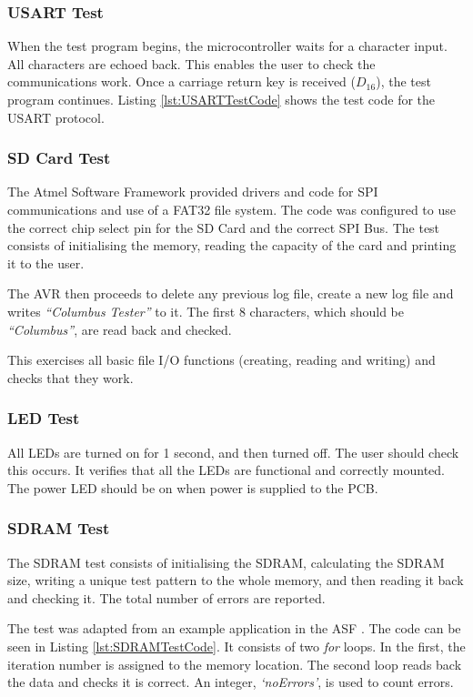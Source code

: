 \subsubsection{USART Test}\label{USART:Test}
When the test program begins, the microcontroller waits for a character input. All characters are echoed back. This enables the user to check the communications work. Once a carriage return key is received ($D_{16}$), the test program continues. Listing \ref{lst:USARTTestCode} shows the test code for the USART protocol.


\subsubsection{SD Card Test}\label{SD:Test}
The Atmel Software Framework \citep{Atmel:ASF} provided drivers and code for SPI communications and use of a FAT32 file system. The code was configured to use the correct chip select pin for the SD Card and the correct SPI Bus. The test consists of initialising the memory, reading the capacity of the card and printing it to the user. 

The AVR then proceeds to delete any previous log file, create a new log file and writes \textit{``Columbus Tester''} to it. The first 8 characters, which should be \textit{``Columbus''}, are read back and checked.

This exercises all basic file I/O functions (creating, reading and writing) and checks that they work.

\subsubsection{LED Test}\label{LED:Test}
All LEDs are turned on for 1 second, and then turned off. The user should check this occurs. It verifies that all the LEDs are functional and correctly mounted. The power LED should be on when power is supplied to the PCB. 

\subsubsection{SDRAM Test}\label{SDRAM:Test}
The SDRAM test consists of initialising the SDRAM, calculating the SDRAM size, writing a unique test pattern to the whole memory, and then reading it back and checking it. The total number of errors are reported. 

The test was adapted from an example application in the ASF \citep{Atmel:ASF}. The code can be seen in Listing \ref{lst:SDRAMTestCode}. It consists of two \textit{for} loops. In the first, the iteration number is assigned to the memory location. The second loop reads back the data and checks it is correct. An integer, \textit{`noErrors'}, is used to count errors. 

